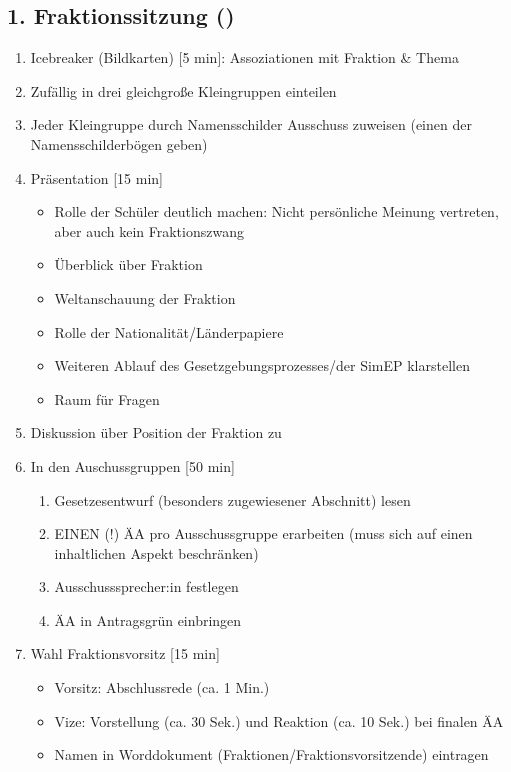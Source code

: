 \documentclass{article}
\begin{document}
	\subsection{1. Fraktionssitzung (\timeFrakOne)}
	\begin{enumerate}
		\item Icebreaker (Bildkarten) [5 min]: \newline Assoziationen mit Fraktion \& Thema
        \item Zufällig in drei gleichgroße Kleingruppen einteilen
        \item Jeder Kleingruppe durch Namensschilder Ausschuss zuweisen (einen der Namensschilderbögen geben)
		\item Präsentation [15 min]
		\begin{itemize}
			\item Rolle der Schüler deutlich machen: \newline
            Nicht persönliche Meinung vertreten, aber auch kein Fraktionszwang
			\item Überblick über Fraktion
			\item Weltanschauung der Fraktion
			\item Rolle der Nationalität/Länderpapiere
			\item Weiteren Ablauf des Gesetzgebungsprozesses/der SimEP klarstellen
            \item Raum für Fragen
		\end{itemize}
		\item Diskussion über Position der Fraktion zu \THEMA \newline [10 min]
		\item In den Auschussgruppen [50 min]
		\begin{enumerate}
			\item Gesetzesentwurf (besonders zugewiesener Abschnitt) lesen
			\item EINEN (!) ÄA pro Ausschussgruppe erarbeiten \newline (muss sich auf einen inhaltlichen Aspekt beschränken)
	        \item Ausschusssprecher:in festlegen		
            \item ÄA in Antragsgrün einbringen
		\end{enumerate} 
		\item Wahl Fraktionsvorsitz [15 min]
		\begin{itemize}
			\item Vorsitz: Abschlussrede (ca. 1 Min.)
			\item Vize: Vorstellung (ca. 30 Sek.) und Reaktion (ca. 10 Sek.) \newline bei finalen ÄA 
			\item Namen in Worddokument (Fraktionen/Fraktionsvorsitzende) \newline eintragen
		\end{itemize}
	\end{enumerate}
	
\end{document}
